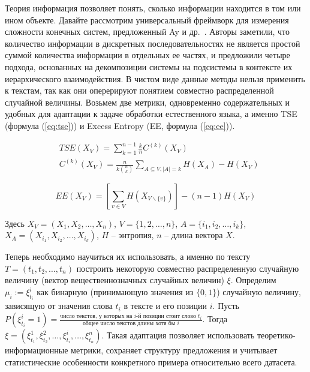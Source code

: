\documentclass{spbau-diploma}
\begin{document}
Теория информация позволяет понять, сколько информации находится в том или ином объекте. Давайте рассмотрим универсальный фреймворк для измерения сложности конечных систем, предложенный Ay и др.~\cite{ay2006unifying}. Авторы заметили, что количество информации в дискретных последовательностях не является простой суммой количества информации в отдельных ее частях, и предложили четыре подхода, основанных на декомпозиции системы на подсистемы в контексте их иерархического взаимодействия. В чистом виде данные методы нельзя применить к текстам, так как они оперерируют понятием совместно распределенной случайной величины. Возьмем две метрики, одновременно содержательных и удобных для адаптации к задаче обработки естественного языка, а именно TSE (формула (\ref{eq:tse})) и Excess Entropy (EE, формула (\ref{eq:ee})).

\begin{equation} \label{eq:tse}
\begin{split}
	& TSE(X_V) = \sum\limits_{k=1}^{n-1}\frac{k}{n}C^{(k)}(X_V) \\
	& C^{(k)}(X_V) = \frac{n}{k\binom{n}{k}}\sum\limits_{A\subseteq V,|A|=k}H(X_A) - H(X_V)
\end{split}
\end{equation}

\begin{equation} \label{eq:ee}
EE(X_V) = \left[\sum\limits_{v\in V}H(X_{V\backslash\{v\}})\right] - (n - 1)H(X_V)
\end{equation}

Здесь $X_V = \left(X_1,X_2,\ldots,X_n\right)$, $V = \{1,2,\ldots,n\}$, $A=\{i_1,i_2,\ldots,i_k\}$, $X_A = \left(X_{i_1},X_{i_2},\ldots,X_{i_k}\right)$, $H$ -- энтропия, $n$ -- длина вектора $X$.

Теперь необходимо научиться их использовать, а именно по тексту $T=(t_1,t_2,\ldots,t_n)$ построить некоторую совместно распределенную случайную величину (вектор вещественнозначных случайных величин) $\xi$. Определим $\mu_i := \xi_{t_i}^{i}$ как бинарную (принимающую значения из $\{0, 1\}$) случайную величину, зависящую от значения слова $t_i$ в тексте и его позиции $i$. Пусть $P(\xi_{t_i}^i = 1) = \frac{\text{число текстов, у которых на } i \text{-й позиции стоит слово } t_i}{\text{общее число текстов длины хотя бы }i}$. Тогда $\xi = (\xi_{t_1}^1,\xi_{t_2}^2,\ldots,\xi_{t_i}^i,\ldots,\xi_{t_n}^n)$. Такая адаптация позволяет использовать теоретико-информационные метрики, сохраняет структуру предложения и учитывает статистические особенности конкретного примера относительно всего датасета.
\end{document}
